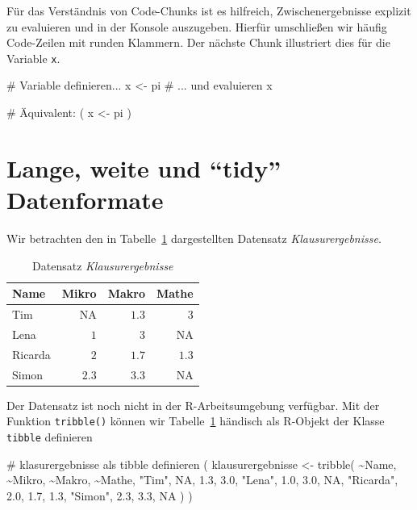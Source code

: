 \documentclass[
  a4paper,
  DIV=11,
  oneside]{scrreprt}
\newenvironment{Shaded}{\begin{snugshade}}{\end{snugshade}}
\newcommand{\NormalTok}[1]{\textcolor[rgb]{0.00,0.23,0.31}{#1}}
\begin{document}
Für das Verständnis von Code-Chunks ist es hilfreich, Zwischenergebnisse
explizit zu evaluieren und in der Konsole auszugeben. Hierfür
umschließen wir häufig Code-Zeilen mit runden Klammern. Der nächste
Chunk illustriert dies für die Variable \texttt{x}.

\begin{Shaded}
\begin{Highlighting}[]
\NormalTok{\# Variable definieren...}
\NormalTok{x \textless{}{-} pi}
\NormalTok{\# ... und evaluieren}
\NormalTok{x}

\NormalTok{\# Äquivalent:}
\NormalTok{(}
\NormalTok{  x \textless{}{-} pi}
\NormalTok{)}
\end{Highlighting}
\end{Shaded}

\section{Lange, weite und ``tidy''
Datenformate}\label{lange-weite-und-tidy-datenformate}

Wir betrachten den in Tabelle~\ref{tbl-Klausurergebnisse} dargestellten
Datensatz \emph{Klausurergebnisse}.

\begin{longtable}{lrrr}

\caption{\label{tbl-Klausurergebnisse}Datensatz
\emph{Klausurergebnisse}}

\tabularnewline

\toprule
Name & Mikro & Makro & Mathe \\ 
\midrule\addlinespace[2.5pt]
Tim & NA & $1.3$ & $3$ \\ 
Lena & $1$ & $3$ & NA \\ 
Ricarda & $2$ & $1.7$ & $1.3$ \\ 
Simon & $2.3$ & $3.3$ & NA \\ 
\bottomrule

\end{longtable}

Der Datensatz ist noch nicht in der R-Arbeitsumgebung verfügbar. Mit der
Funktion \texttt{tribble()} können wir
Tabelle~\ref{tbl-Klausurergebnisse} händisch als R-Objekt der Klasse
\texttt{tibble} definieren

\begin{Shaded}
\begin{Highlighting}[]
\NormalTok{\# \textquotesingle{}klasurergebnisse\textquotesingle{} als tibble definieren}
\NormalTok{(}
\NormalTok{  klausurergebnisse \textless{}{-} tribble(}
\NormalTok{    \textasciitilde{}Name,    \textasciitilde{}Mikro, \textasciitilde{}Makro, \textasciitilde{}Mathe,}
\NormalTok{    "Tim",        NA,    1.3,    3.0,}
\NormalTok{    "Lena",      1.0,    3.0,     NA,}
\NormalTok{    "Ricarda",   2.0,    1.7,    1.3,}
\NormalTok{    "Simon",     2.3,    3.3,     NA}
\NormalTok{  )}
\NormalTok{)}
\end{Highlighting}
\end{Shaded}
\end{document}

